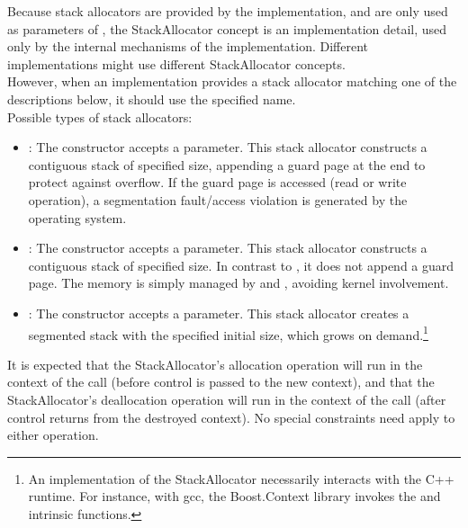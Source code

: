 Because stack allocators are provided by the implementation, and are only used
as parameters of \callcc, the StackAllocator concept is an implementation detail,
used only by the internal mechanisms of the \cc implementation. Different
implementations might use different StackAllocator concepts.\\

However, when an implementation provides a stack allocator matching one of
the descriptions below, it should use the specified name.\\

Possible types of stack allocators:
\begin{itemize}
    \item {}: The constructor accepts a 
          parameter. This stack allocator constructs a contiguous stack of
          specified size, appending a guard page at the end to protect against
          overflow. If the guard page is accessed (read or write operation), a
          segmentation fault/access violation is generated by the operating
          system.
    \item {}: The constructor accepts a  parameter.
          This stack allocator constructs a contiguous stack of specified size.
          In contrast to , it does not append a guard
          page. The memory is simply managed by 
          and , avoiding kernel involvement.
    \item {}: The constructor accepts a  parameter.
          This stack allocator creates a segmented stack\cite{gccsplit} with the
          specified initial size, which grows on demand.\footnote{An
          implementation of the  StackAllocator necessarily
          interacts with the C++ runtime. For instance, with gcc, the
          Boost.Context\cite{bcontext} library invokes
          the 
          and  intrinsic
          functions.\cite{splitalloc}\citecomma\cite{bctxseg}}
\end{itemize}

It is expected that the StackAllocator's allocation operation will run in the
context of the \callcc call (before control is passed to the new context), and
that the StackAllocator's deallocation operation will run in the context of
the \dtor call (after control returns from the destroyed
context). No special constraints need apply to either operation.
